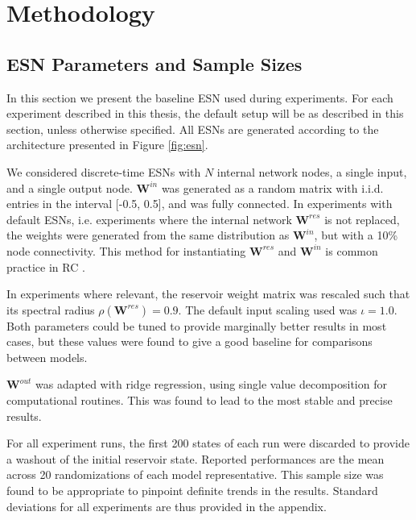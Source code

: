\chapter{Methodology}
\label{ch:method}

\section{ESN Parameters and Sample Sizes}
\label{sec:esn-param}

In this section we present the baseline ESN used during experiments. For each
experiment described in this thesis, the default setup will be as described in
this section, unless otherwise specified. All ESNs are generated according to
the architecture presented in Figure \ref{fig:esn}.

We considered discrete-time ESNs with $N$ internal network nodes, a single
input, and a single output node. $\mathbf{W}^{in}$ was generated as a random
matrix with i.i.d. entries in the interval [-0.5, 0.5], and was fully
connected. In experiments with default ESNs, i.e. experiments where the internal
network $\mathbf{W}^{res}$ is not replaced, the weights were generated from the
same distribution as $\mathbf{W}^{in}$, but with a 10\% node connectivity. This
method for instantiating $\mathbf{W}^{res}$ and $\mathbf{W}^{in}$ is common
practice in RC \cite{montavon_practical_2012}.

In experiments where relevant, the reservoir weight matrix was rescaled such
that its spectral radius $\rho(\mathbf{W}^{res}) = 0.9$. The default input
scaling used was $\iota = 1.0$. Both parameters could be tuned to provide
marginally better results in most cases, but these values were found to give a
good baseline for comparisons between models.

$\mathbf{W}^{out}$ was adapted with ridge regression, using single value
decomposition for computational routines. This was found to lead to the most
stable and precise results.

For all experiment runs, the first 200 states of each run were discarded to
provide a washout of the initial reservoir state. Reported performances are the
mean across 20 randomizations of each model representative. This sample size was
found to be appropriate to pinpoint definite trends in the results. Standard
deviations for all experiments are thus provided in the appendix.

